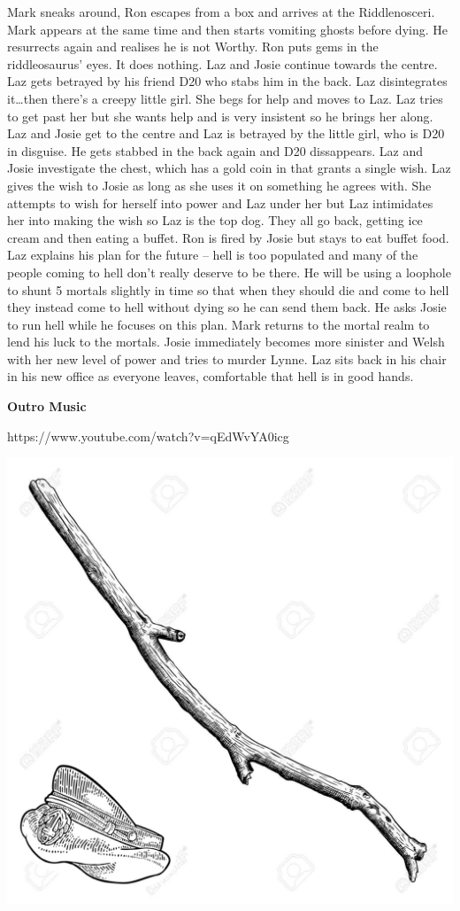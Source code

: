 Mark sneaks around, Ron escapes from a box and arrives at the Riddlenosceri. Mark appears at the same time and then starts vomiting ghosts before dying. He resurrects again and realises he is not Worthy. Ron puts gems in the riddleosaurus’ eyes. It does nothing. Laz and Josie continue towards the centre. Laz gets betrayed by his friend D20 who stabs him in the back. Laz disintegrates it…then there’s a creepy little girl. She begs for help and moves to Laz. Laz tries to get past her but she wants help and is very insistent so he brings her along. Laz and Josie get to the centre and Laz is betrayed by the little girl, who is D20 in disguise. He gets stabbed in the back again and D20 dissappears. Laz and Josie investigate the chest, which has a gold coin in that grants a single wish. Laz gives the wish to Josie as long as she uses it on something he agrees with. She attempts to wish for herself into power and Laz under her but Laz intimidates her into making the wish so Laz is the top dog. They all go back, getting ice cream and then eating a buffet. Ron is fired by Josie but stays to eat buffet food. Laz explains his plan for the future – hell is too populated and many of the people coming to hell don’t really deserve to be there. He will be using a loophole to shunt 5 mortals slightly in time so that when they should die and come to hell they instead come to hell without dying so he can send them back. He asks Josie to run hell while he focuses on this plan. Mark returns to the mortal realm to lend his luck to the mortals. Josie immediately becomes more sinister and Welsh with her new level of power and tries to murder Lynne. Laz sits back in his chair in his new office as everyone leaves, comfortable that hell is in good hands.\medskip

\textbf{Outro Music}\medskip

https://www.youtube.com/watch?v=qEdWvYA0icg\medskip



\vspace*{5mm}

\begin{center}
\includegraphics[width=\textwidth]{./content/img/xxx.jpg}
\begin{figure}[h]
\end{figure}
\end{center}

\clearpage